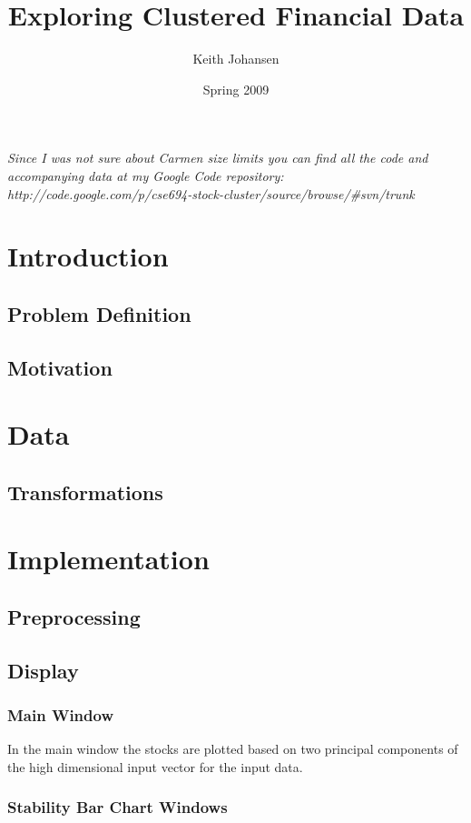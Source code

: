 \documentclass{article}
\author{Keith Johansen}
\title{Exploring Clustered Financial Data}
\date{Spring 2009}
\begin{document}
\maketitle


\textit{Since I was not sure about Carmen size limits you can find all the code and accompanying data at my Google Code repository: http://code.google.com/p/cse694-stock-cluster/source/browse/\#svn/trunk}
\begin{multicols}{2}
\section{Introduction}
\subsection{Problem Definition}

\subsection{Motivation}

\section{Data}
\subsection{Transformations}

\section{Implementation}
\subsection{Preprocessing}
\subsection{Display}
\subsubsection{Main Window}
In the main window the stocks are plotted based on two principal components of the high dimensional input vector for the input data.
\subsubsection{Stability Bar Chart Windows}

\end{multicols}
\end{document}
